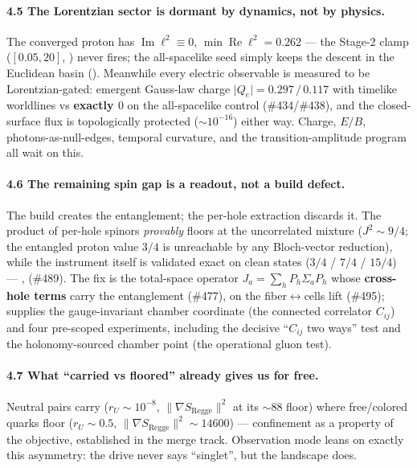 \documentclass[11pt]{article}
\newcommand{\abs}[1]{\lvert #1 \rvert}
\newcommand{\norm}[1]{\lVert #1 \rVert}
\newcommand{\rU}{r_{U}}
\newcommand{\gradS}{\norm{\nabla S_{\mathrm{Regge}}}^2}
\begin{document}
\paragraph{4.5 The Lorentzian sector is dormant by dynamics, not by physics.}
The converged proton has $\operatorname{Im}\ell^2 \equiv 0$,
$\min\operatorname{Re}\ell^2 = 0.262$ --- the Stage-2 clamp ($[0.05, 20]$,
) never fires; the all-spacelike seed simply keeps the
descent in the Euclidean basin (). Meanwhile
every electric observable is measured to be Lorentzian-gated: emergent Gauss-law charge
$\abs{Q_e} = 0.297\,/\,0.117$ with timelike worldlines vs \textbf{exactly $0$} on the
all-spacelike control (\#434/\#438), and the closed-surface flux is topologically
protected ($\sim 10^{-16}$) either way. Charge, $E/B$, photons-as-null-edges, temporal
curvature, and the transition-amplitude program all wait on this.

\paragraph{4.6 The remaining spin gap is a readout, not a build defect.}
The build creates the entanglement; the per-hole extraction discards it. The product of
per-hole spinors \emph{provably} floors at the uncorrelated mixture ($J^2 \sim 9/4$; the
entangled proton value $3/4$ is unreachable by any Bloch-vector reduction), while the
instrument itself is validated exact on clean states ($3/4$ / $7/4$ / $15/4$) ---
,  (\#489). The fix is
the total-space operator $J_a = \sum_h P_h \Sigma_a P_h$ whose \textbf{cross-hole terms}
carry the entanglement (\#477), on the fiber$\leftrightarrow$cells lift (\#495);
 supplies the gauge-invariant chamber coordinate (the
connected correlator $C_{ij}$) and four pre-scoped experiments, including the decisive
``$C_{ij}$ two ways'' test and the holonomy-sourced chamber point (the operational gluon
test).

\paragraph{4.7 What ``carried vs floored'' already gives us for free.}
Neutral pairs carry ($\rU \sim 10^{-8}$, $\gradS$ at its ${\sim}88$ floor) where
free/colored quarks floor ($\rU \sim 0.5$, $\gradS \sim 14600$) --- confinement as a
property of the objective, established in the merge track. Observation mode leans on
exactly this asymmetry: the drive never says ``singlet'', but the landscape does.
\end{document}
